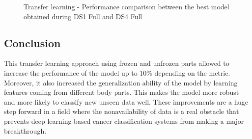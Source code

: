 \begin{figure}[!h]
\centering
\noindent
{}
\caption{Transfer learning - Performance comparison between the best model obtained during DS1 Full and DS4 Full}
\label{fig:tl_results_test_set}
\end{figure}


\subsection{Conclusion}
\setlength{\marginparwidth}{3cm}\leavevmode {}This transfer learning approach using frozen and unfrozen parts allowed to increase the performance of the model up to 10\% depending on the metric. Moreover, it also increased the generalization ability of the model by learning features coming from different body parts. This makes the model more robust and more likely to classify new unseen data well. These improvements are a huge step forward in a field where the nonavailability of data is a real obstacle that prevents deep learning-based cancer classification systems from making a major breakthrough.


%
% 
% 